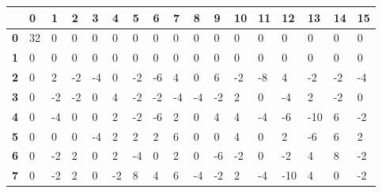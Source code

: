 \begin{longtable}[c]{|l|l|l|l|l|l|l|l|l|l|l|l|l|l|l|l|l|}
\hline
            & \textbf{0} & \textbf{1} & \textbf{2} & \textbf{3} & \textbf{4} & \textbf{5} & \textbf{6} & \textbf{7} & \textbf{8} & \textbf{9} & \textbf{10} & \textbf{11} & \textbf{12} & \textbf{13} & \textbf{14} & \textbf{15} \\ \hline
\endfirsthead
%
\endhead
%
\textbf{0}  & 32         & 0          & 0          & 0          & 0          & 0          & 0          & 0          & 0          & 0          & 0           & 0           & 0           & 0           & 0           & 0           \\ \hline
\textbf{1}  & 0          & 0          & 0          & 0          & 0          & 0          & 0          & 0          & 0          & 0          & 0           & 0           & 0           & 0           & 0           & 0           \\ \hline
\textbf{2}  & 0          & 2          & -2         & -4         & 0          & -2         & -6         & 4          & 0          & 6          & -2          & -8          & 4           & -2          & -2          & -4          \\ \hline
\textbf{3}  & 0          & -2         & -2         & 0          & 4          & -2         & -2         & -4         & -4         & -2         & 2           & 0           & -4          & 2           & -2          & 0           \\ \hline
\textbf{4}  & 0          & -4         & 0          & 0          & 2          & -2         & -6         & 2          & 0          & 4          & 4           & -4          & -6          & -10         & 6           & -2          \\ \hline
\textbf{5}  & 0          & 0          & 0          & -4         & 2          & 2          & 2          & 6          & 0          & 0          & 4           & 0           & 2           & -6          & 6           & 2           \\ \hline
\textbf{6}  & 0          & -2         & 2          & 0          & 2          & -4         & 0          & 2          & 0          & -6         & -2          & 0           & -2          & 4           & 8           & -2          \\ \hline
\textbf{7}  & 0          & -2         & 2          & 0          & -2         & 8          & 4          & 6          & -4         & -2         & 2           & -4          & -10         & 4           & 0           & -2          \\ \hline

\end{longtable}
